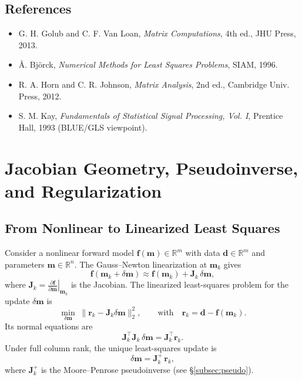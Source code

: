 \documentclass[11pt,a4paper]{article}
\begin{document}
\subsection*{References}
\begin{itemize}
  \item G. H. Golub and C. F. Van Loan, \emph{Matrix Computations}, 4th ed., JHU Press, 2013.
  \item \AA. Bj\"orck, \emph{Numerical Methods for Least Squares Problems}, SIAM, 1996.
  \item R. A. Horn and C. R. Johnson, \emph{Matrix Analysis}, 2nd ed., Cambridge Univ. Press, 2012.
  \item S. M. Kay, \emph{Fundamentals of Statistical Signal Processing, Vol. I}, Prentice Hall, 1993 (BLUE/GLS viewpoint).
\end{itemize}



\section{Jacobian Geometry, Pseudoinverse, and Regularization}

\subsection{From Nonlinear to Linearized Least Squares}
Consider a nonlinear forward model $\mathbf{f}(\mathbf{m}) \in \mathbb{R}^m$ with data $\mathbf{d}\in\mathbb{R}^m$ and parameters $\mathbf{m}\in\mathbb{R}^n$. The Gauss--Newton linearization at $\mathbf{m}_k$ gives
\[
\mathbf{f}(\mathbf{m}_k+\delta\mathbf{m}) \approx \mathbf{f}(\mathbf{m}_k) + \mathbf{J}_k\,\delta\mathbf{m},
\]
where $\mathbf{J}_k = \left.\frac{\partial \mathbf{f}}{\partial \mathbf{m}}\right|_{\mathbf{m}_k}$ is the Jacobian. The linearized least-squares problem for the update $\delta\mathbf{m}$ is
\[
\min_{\delta\mathbf{m}} \; \|\mathbf{r}_k - \mathbf{J}_k \delta\mathbf{m}\|_2^2,
\qquad \text{with} \quad \mathbf{r}_k = \mathbf{d} - \mathbf{f}(\mathbf{m}_k).
\]
Its normal equations are
\[
\mathbf{J}_k^\top \mathbf{J}_k \,\delta\mathbf{m} = \mathbf{J}_k^\top \mathbf{r}_k.
\]
Under full column rank, the unique least-squares update is
\[
\delta\mathbf{m} = \mathbf{J}_k^{+}\,\mathbf{r}_k,
\]
where $\mathbf{J}_k^{+}$ is the Moore--Penrose pseudoinverse (see \S\ref{subsec:pseudo}).
\end{document}
